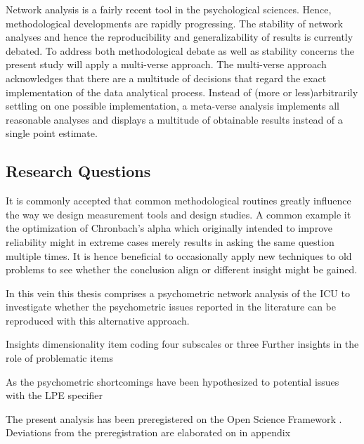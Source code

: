 Network analysis is a fairly recent tool in the psychological sciences.
Hence, methodological developments are rapidly progressing.
The stability of network analyses and hence the reproducibility and generalizability of results is currently debated. 
To address both methodological debate as well as stability concerns the present study will apply a multi-verse approach.
The multi-verse approach acknowledges that there are a multitude of decisions that regard the exact implementation of the data analytical process.
Instead of (more or less)arbitrarily settling on one possible implementation, a meta-verse analysis implements all reasonable analyses and displays a multitude of obtainable results instead of a single point estimate.


\subsection{Research Questions}
It is commonly accepted that common methodological routines greatly influence the way we design measurement tools and design studies.
A common example it the optimization of Chronbach's alpha which originally intended to improve reliability might in extreme cases merely results in asking the same question multiple times.
It is hence beneficial to occasionally apply new techniques to old problems to see whether the conclusion align or different insight might be gained.

In this vein this thesis comprises a psychometric network analysis of the ICU to investigate whether the psychometric issues reported in the literature can be reproduced with this
alternative approach.

Insights dimensionality
item coding four subscales or three
Further insights in the role of problematic items

As the psychometric shortcomings have been hypothesized to potential issues with the LPE specifier \parencite{cardinale_reliability_2017} 

The present analysis has been preregistered on the Open Science Framework . 
Deviations from the preregistration are elaborated on in appendix  



